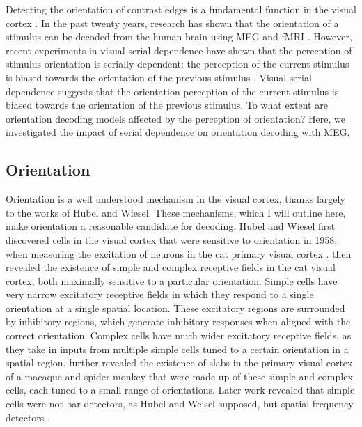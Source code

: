 \documentclass[../main.tex]{subfiles}
\begin{document}
Detecting the orientation of contrast edges is a fundamental function in the visual cortex \citep{hubel_wiesel_1959, hubel_wiesel_1968}. In the past twenty years, research has shown that the orientation of a stimulus can be decoded from the human brain using MEG and fMRI \citep{haynes_rees_2005, kamitani_tong_2005, mannion_mcdonald_clifford_2009, cichy_ramirez_pantazis_2015}. However, recent experiments in visual serial dependence have shown that the perception of stimulus orientation is serially dependent: the perception of the current stimulus is biased towards the orientation of the previous stimulus \citep{fischer_whitney_2014}. Visual serial dependence suggests that the orientation perception of the current stimulus is biased towards the orientation of the previous stimulus. To what extent are orientation decoding models affected by the perception of orientation? Here, we investigated the impact of serial dependence on orientation decoding with MEG.

\subsection{Orientation}
Orientation is a well understood mechanism in the visual cortex, thanks largely to the works of Hubel and Wiesel. These mechanisms, which I will outline here, make orientation a reasonable candidate for decoding. Hubel and Wiesel first discovered cells in the visual cortex that were sensitive to orientation in 1958, when measuring the excitation of neurons in the cat primary visual cortex \citep{hubel_wiesel_1959}. \cite{hubel_wiesel_1962} then revealed the existence of simple and complex receptive fields in the cat visual cortex, both maximally sensitive to a particular orientation. Simple cells have very narrow excitatory receptive fields in which they respond to a single orientation at a single spatial location. These excitatory regions are surrounded by inhibitory regions, which generate inhibitory responses when aligned with the correct orientation. Complex cells have much wider excitatory receptive fields, as they take in inputs from multiple simple cells tuned to a certain orientation in a spatial region. \cite{hubel_wiesel_1968} further revealed the existence of slabs in the primary visual cortex of a macaque and spider monkey that were made up of these simple and complex cells, each tuned to a small range of orientations. Later work revealed that simple cells were not bar detectors, as Hubel and Weisel supposed, but spatial frequency detectors \citep{DEVALOIS1982545, devalois_1978}. 
\end{document}

